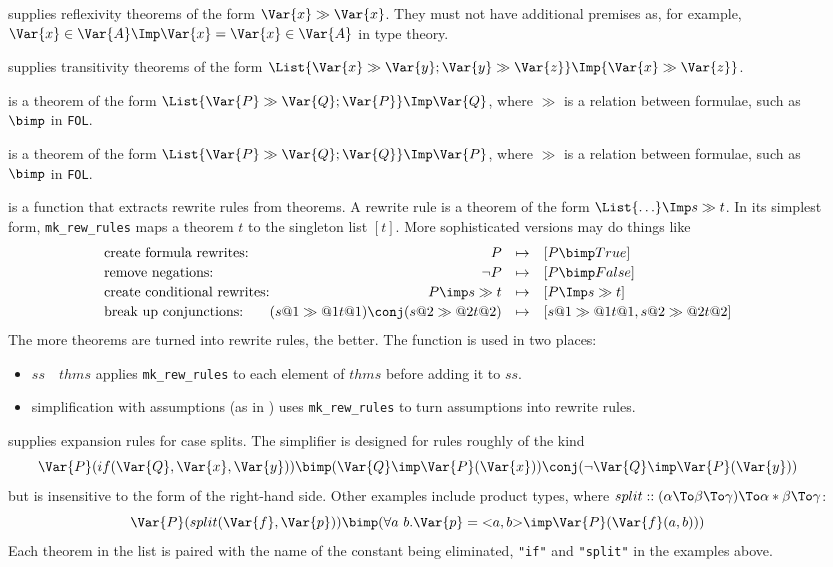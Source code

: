 \begin{description}
\item[] 
supplies reflexivity theorems of the form $\Var{x} \gg
\Var{x}$.  They must not have additional premises as, for example,
$\Var{x}\in\Var{A} \Imp \Var{x} = \Var{x}\in\Var{A}$ in type theory.

\item[] 
supplies transitivity theorems of the form
$\List{\Var{x}\gg\Var{y}; \Var{y}\gg\Var{z}} \Imp {\Var{x}\gg\Var{z}}$.

\item[] 
is a theorem of the form $\List{\Var{P}\gg\Var{Q};
\Var{P}} \Imp \Var{Q}$, where $\gg$ is a relation between formulae, such as
$\bimp$ in {\tt FOL}.

\item[] 
is a theorem of the form $\List{\Var{P}\gg\Var{Q};
\Var{Q}} \Imp \Var{P}$, where $\gg$ is a relation between formulae, such as
$\bimp$ in {\tt FOL}.

\item[] 
is a function that extracts rewrite rules from theorems.  A rewrite rule is
a theorem of the form $\List{\ldots}\Imp s \gg t$.  In its simplest form,
{\tt mk_rew_rules} maps a theorem $t$ to the singleton list $[t]$.  More
sophisticated versions may do things like
\[
\begin{array}{l@{}r@{\quad\mapsto\quad}l}
\mbox{create formula rewrites:}& P & [P \bimp True] \\[.5ex]
\mbox{remove negations:}& \lnot P & [P \bimp False] \\[.5ex]
\mbox{create conditional rewrites:}& P\imp s\gg t & [P\Imp s\gg t] \\[.5ex]
\mbox{break up conjunctions:}& 
        (s@1 \gg@1 t@1) \conj (s@2 \gg@2 t@2) & [s@1 \gg@1 t@1, s@2 \gg@2 t@2]
\end{array}
\]
The more theorems are turned into rewrite rules, the better.  The function
is used in two places:
\begin{itemize}
\item 
$ss$~~$thms$ applies {\tt mk_rew_rules} to each element of
$thms$ before adding it to $ss$.
\item 
simplification with assumptions (as in ) uses
{\tt mk_rew_rules} to turn assumptions into rewrite rules.
\end{itemize}

\item[] 
supplies expansion rules for case splits.  The simplifier is designed
for rules roughly of the kind
\[ \Var{P}(if(\Var{Q},\Var{x},\Var{y})) \bimp (\Var{Q} \imp \Var{P}(\Var{x}))
\conj (\lnot\Var{Q} \imp \Var{P}(\Var{y})) 
\] 
but is insensitive to the form of the right-hand side.  Other examples
include product types, where $split ::
(\alpha\To\beta\To\gamma)\To\alpha*\beta\To\gamma$:
\[ \Var{P}(split(\Var{f},\Var{p})) \bimp (\forall a~b. \Var{p} =
{<}a,b{>} \imp \Var{P}(\Var{f}(a,b))) 
\] 
Each theorem in the list is paired with the name of the constant being
eliminated, {\tt"if"} and {\tt"split"} in the examples above.


\end{description}
